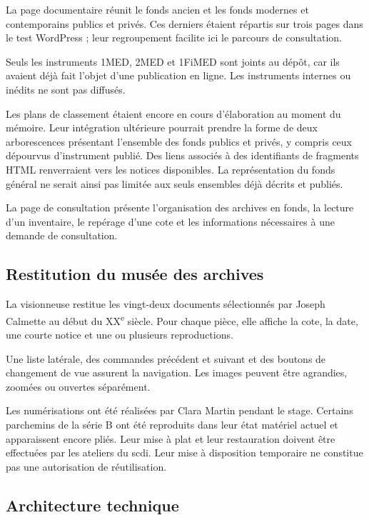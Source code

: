 La page documentaire réunit le fonds ancien et les fonds modernes et contemporains publics et privés. Ces derniers étaient répartis sur trois pages dans le test WordPress ; leur regroupement facilite ici le parcours de consultation.

Seuls les instruments 1MED, 2MED et 1FiMED sont joints au dépôt, car ils avaient déjà fait l'objet d'une publication en ligne. Les instruments internes ou inédits ne sont pas diffusés.

Les plans de classement étaient encore en cours d'élaboration au moment du mémoire. Leur intégration ultérieure pourrait prendre la forme de deux arborescences présentant l'ensemble des fonds publics et privés, y compris ceux dépourvus d'instrument publié. Des liens associés à des identifiants de fragments HTML renverraient vers les notices disponibles. La représentation du fonds général ne serait ainsi pas limitée aux seuls ensembles déjà décrits et publiés.

La page de consultation présente l'organisation des archives en fonds, la lecture d'un inventaire, le repérage d'une cote et les informations nécessaires à une demande de consultation.

\subsection{Restitution du musée des archives}
\label{annexe:musee-archives}

La visionneuse restitue les vingt-deux documents sélectionnés par Joseph Calmette au début du XX\textsuperscript{e} siècle. Pour chaque pièce, elle affiche la cote, la date, une courte notice et une ou plusieurs reproductions.

Une liste latérale, des commandes précédent et suivant et des boutons de changement de vue assurent la navigation. Les images peuvent être agrandies, zoomées ou ouvertes séparément.

Les numérisations ont été réalisées par Clara Martin pendant le stage. Certains parchemins de la série B ont été reproduits dans leur état matériel actuel et apparaissent encore pliés. Leur mise à plat et leur restauration doivent être effectuées par les ateliers du \gls{scdi}. Leur mise à disposition temporaire ne constitue pas une autorisation de réutilisation.

\subsection{Architecture technique}

